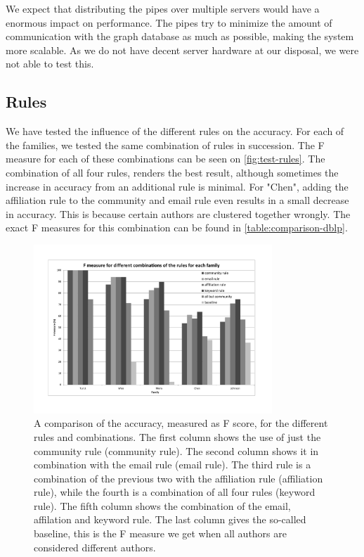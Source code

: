 We expect that distributing the pipes over multiple servers would have a enormous impact on performance. The pipes try to minimize the amount of communication with the graph database as much as possible, making the system more scalable. As we do not have decent server hardware at our disposal, we were not able to test this.

\subsection{Rules}

We have tested the influence of the different rules on the accuracy. For each of the families, we tested the same combination of rules in succession. The F measure for each of these combinations can be seen on \autoref{fig:test-rules}. The combination of all four rules, renders the best result, although sometimes the increase in accuracy from an additional rule is minimal. For "Chen", adding the affiliation rule to the community and email rule even results in a small decrease in accuracy. This is because certain authors are clustered together wrongly. The exact F measures for this combination can be found in \autoref{table:comparison-dblp}. 

\begin{figure}[htb]
	\centering
		\includegraphics[width=0.80\textwidth]{./fig/test-rules.pdf}
	\caption{A comparison of the accuracy, measured as F score, for the different rules and combinations. The first column shows the use of just the community rule (community rule). The second column shows it in combination with the email rule (email rule). The third rule is a combination of the previous two with the affiliation rule (affiliation rule), while the fourth is a combination of all four rules (keyword rule). The fifth column shows the combination of the email, affilation and keyword rule. The last column gives the so-called baseline, this is the F measure we get when all authors are considered different authors.}
	\label{fig:test-rules}
\end{figure}

